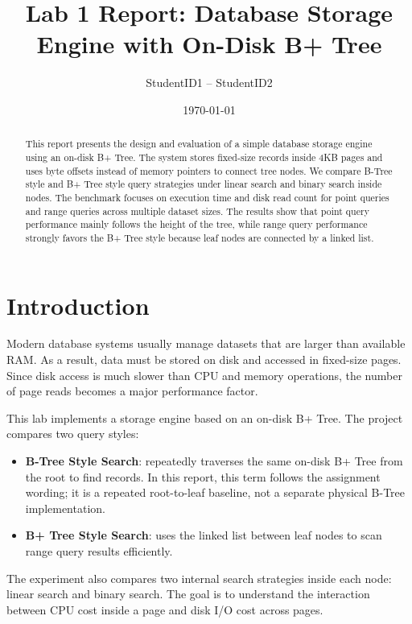 \documentclass[12pt,a4paper]{article}
\title{Lab 1 Report: Database Storage Engine with On-Disk B+ Tree}
\author{StudentID1 -- StudentID2}
\date{\today}
\begin{document}
\maketitle

\begin{abstract}
This report presents the design and evaluation of a simple database storage engine using an on-disk B+ Tree. The system stores fixed-size records inside 4KB pages and uses byte offsets instead of memory pointers to connect tree nodes. We compare B-Tree style and B+ Tree style query strategies under linear search and binary search inside nodes. The benchmark focuses on execution time and disk read count for point queries and range queries across multiple dataset sizes. The results show that point query performance mainly follows the height of the tree, while range query performance strongly favors the B+ Tree style because leaf nodes are connected by a linked list.
\end{abstract}

\section{Introduction}

Modern database systems usually manage datasets that are larger than available RAM. As a result, data must be stored on disk and accessed in fixed-size pages. Since disk access is much slower than CPU and memory operations, the number of page reads becomes a major performance factor.

This lab implements a storage engine based on an on-disk B+ Tree. The project compares two query styles:

\begin{itemize}
    \item \textbf{B-Tree Style Search}: repeatedly traverses the same on-disk B+ Tree from the root to find records. In this report, this term follows the assignment wording; it is a repeated root-to-leaf baseline, not a separate physical B-Tree implementation.
    \item \textbf{B+ Tree Style Search}: uses the linked list between leaf nodes to scan range query results efficiently.
\end{itemize}

The experiment also compares two internal search strategies inside each node: linear search and binary search. The goal is to understand the interaction between CPU cost inside a page and disk I/O cost across pages.
\end{document}
